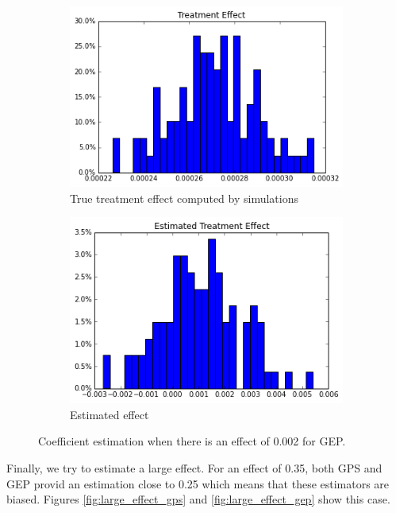 \documentclass[11pt]{article}
\begin{document}
\begin{figure}[h]
\centering
\begin{subfigure}{.5\textwidth}
  \centering
  \includegraphics[width=.9\linewidth]{treatment_effect_no_influence.png}
  \caption{True treatment effect computed by simulations}
  \label{fig:sub1}
\end{subfigure}%
\begin{subfigure}{.5\textwidth}
  \centering
  \includegraphics[width=.9\linewidth]{estimated_small_effect_gep.png}
  \caption{Estimated effect}
  \label{fig:sub2}
\end{subfigure}
\caption{Coefficient estimation when there is an effect of 0.002 for GEP.}
\label{fig:small_effect_gep}
\end{figure}

\FloatBarrier

Finally, we try to estimate a large effect. For an effect of 0.35, both GPS and GEP provid an estimation close to 0.25 which means that these estimators are biased. Figures \ref{fig:large_effect_gps} and \ref{fig:large_effect_gep} show this case. \\
\end{document}
